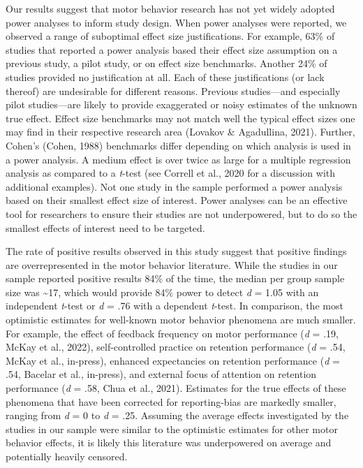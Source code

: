 \documentclass[
  man, donotrepeattitle,mask,floatsintext]{apa7}
\begin{document}
Our results suggest that motor behavior research has not yet widely adopted power analyses to inform study design. When power analyses were reported, we observed a range of suboptimal effect size justifications. For example, 63\% of studies that reported a power analysis based their effect size assumption on a previous study, a pilot study, or on effect size benchmarks. Another 24\% of studies provided no justification at all. Each of these justifications (or lack thereof) are undesirable for different reasons. Previous studies---and especially pilot studies---are likely to provide exaggerated or noisy estimates of the unknown true effect. Effect size benchmarks may not match well the typical effect sizes one may find in their respective research area (Lovakov \& Agadullina, 2021). Further, Cohen's (Cohen, 1988) benchmarks differ depending on which analysis is used in a power analysis. A medium effect is over twice as large for a multiple regression analysis as compared to a \emph{t}-test (see Correll et al., 2020 for a discussion with additional examples). Not one study in the sample performed a power analysis based on their smallest effect size of interest. Power analyses can be an effective tool for researchers to ensure their studies are not underpowered, but to do so the smallest effects of interest need to be targeted.

The rate of positive results observed in this study suggest that positive findings are overrepresented in the motor behavior literature. While the studies in our sample reported positive results 84\% of the time, the median per group sample size was \textasciitilde17, which would provide 84\% power to detect \emph{d} = 1.05 with an independent \emph{t}-test or \emph{d} = .76 with a dependent \emph{t}-test. In comparison, the most optimistic estimates for well-known motor behavior phenomena are much smaller. For example, the effect of feedback frequency on motor performance (\emph{d} = .19, McKay et al., 2022), self-controlled practice on retention performance (\emph{d} = .54, McKay et al., in-press), enhanced expectancies on retention performance (\emph{d} = .54, Bacelar et al., in-press), and external focus of attention on retention performance (\emph{d} = .58, Chua et al., 2021). Estimates for the true effects of these phenomena that have been corrected for reporting-bias are markedly smaller, ranging from \emph{d} = 0 to \emph{d} = .25. Assuming the average effects investigated by the studies in our sample were similar to the optimistic estimates for other motor behavior effects, it is likely this literature was underpowered on average and potentially heavily censored.
\end{document}

